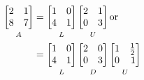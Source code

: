 \documentclass[../main.tex]{subfiles}
\begin{document}
{\[
\begin{aligned}
\underbracket[0pt][0pt]{
\begin{bmatrix*}[r]
2 & 1 \\
8 & 7
\end{bmatrix*}
}_{\mathstrut A}
&=
\underbracket[0pt][0pt]{
\begin{bmatrix*}[r]
1 & 0 \\
4 & 1
\end{bmatrix*}
}_{\mathstrut L}
\underbracket[0pt][0pt]{
\begin{bmatrix*}[r]
2 & 1 \\
0 & 3
\end{bmatrix*}
}_{\mathstrut U}
\text{or} \\
&
=
\underbracket[0pt][0pt]{
\begin{bmatrix*}[r]
1 & 0 \\
4 & 1
\end{bmatrix*}
}_{\mathstrut L}
\underbracket[0pt][0pt]{
\begin{bmatrix*}[r]
2 & 0 \\ 
0 & 3
\end{bmatrix*}
}_{\mathstrut D}
\underbracket[0pt][0pt]{
\begin{bmatrix*}[r]
1 & \frac{1}{2} \\
0 & 1
\end{bmatrix*}
}_{\mathstrut U}
\end{aligned}
\]
}


\onlyinsubfile{\end{multicols*}}
\end{document}
